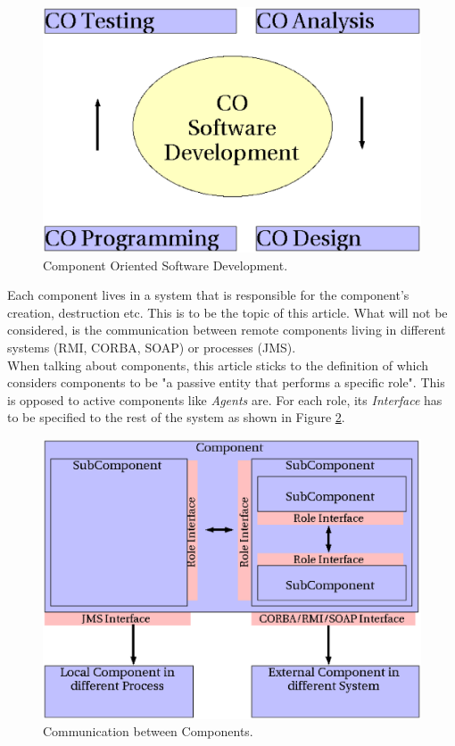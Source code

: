 \documentclass[a4paper,10pt]{llncs}
\begin{document}
\begin{figure}[ht]
\begin{center}
\includegraphics[scale=0.3]{component_oriented_development}
\caption{Component Oriented Software Development.}
\label{fig:component_oriented_development}
\end{center}
\end{figure}

Each component lives in a system that is responsible for the component's
creation, destruction etc. This is to be the topic of this article.
What will not be considered, is the communication between remote components
living in different systems (RMI, CORBA, SOAP) \cite{blueprints} or processes (JMS).\\
When talking about components, this article sticks to the definition of \cite{jakarta}
which considers components to be "a passive entity that performs a specific role".
This is opposed to active components like \emph{Agents} are.
For each role, its \emph{Interface} has to be specified to the rest of the
system as shown in Figure \ref{fig:communication_between_components}.

\begin{figure}[ht]
\begin{center}
\includegraphics[scale=0.2]{communication_between_components}
\caption{Communication between Components.}
\label{fig:communication_between_components}
\end{center}
\end{figure}
\end{document}
